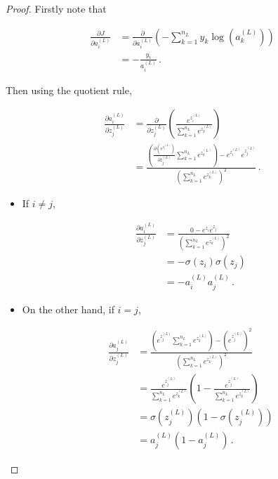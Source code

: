 \documentclass{article}[11pt]
\begin{document}
        
        \begin{proof}
            
            Firstly note that
            
            $$ \begin{aligned}
            \frac{\partial J}{\partial a^{(L)}_i}
            &= \frac{\partial}{\partial a^{(L)}_i} \left( - \sum_{k=1}^{n_L} y_k \log(a^{(L)}_k) \right) \\
            &= - \frac{y_i}{a^{(L)}_i} \,.
            \end{aligned} $$
            
            
            Then using the quotient rule,
            
            $$ \begin{aligned}
            \frac{\partial a^{(L)}_i}{\partial z^{(L)}_j}
            &= \frac{\partial}{\partial z^{(L)}_j} \left( \frac{e^{z^{(L)}_i}}{\sum_{k=1}^{n_L} e^{z^{(L)}_k}} \right) \\
            &= \frac{\left( \frac{\partial \left( e^{z^{(L)}_i}\right)}{\partial z^{(L)}_j} \sum_{k=1}^{n_L} e^{z^{(L)}_k} \right) - e^{z^{(L)}_i} e^{z^{(L)}_j}}{\left( \sum_{k=1}^{n_L} e^{z^{(L)}_k} \right)^2} \,.
            \end{aligned} $$
            
            \begin{itemize}
            
                \item If $i \neq j$,
            
                $$ \begin{aligned}
                \frac{\partial a^{(L)}_i}{\partial z^{(L)}_j}
                &= \frac{0 - e^{z_i} e^{z_j}}{\left( \sum_{k=1}^{n_L} e^{z^{(L)}_k} \right)^2} \\
                &= - \sigma(z_i) \sigma(z_j) \\
                &= - a^{(L)}_i a^{(L)}_j \,.
                \end{aligned} $$
            
                \item On the other hand, if $i = j$,
            
                $$ \begin{aligned}
                \frac{\partial a^{(L)}_j}{\partial z^{(L)}_j}
                &= \frac{\left( e^{z^{(L)}_j} \sum_{k=1}^{n_L} e^{z^{(L)}_k} \right) - \left( e^{z^{(L)}_j} \right)^2}{\left( \sum_{k=1}^{n_L} e^{z^{(L)}_k} \right)^2} \\
                &= \frac{e^{z^{(L)}_j}}{\sum_{k=1}^{n_L} e^{z^{(L)}_k}} \left( 1 - \frac{e^{z^{(L)}_j}}{\sum_{k=1}^{n_L} e^{z^{(L)}_k}} \right) \\
                &= \sigma(z^{(L)}_j) \left( 1 - \sigma(z^{(L)}_j) \right) \\
                &= a^{(L)}_j \left( 1 - a^{(L)}_j \right) \,.
                \end{aligned} $$
            

\end{itemize}
\end{proof}
\end{document}
